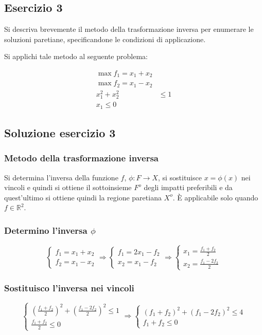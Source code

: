 \documentclass[\main/main.tex]{subfiles}
\begin{document}
\subsection{Esercizio 3}
Si descriva brevemente il metodo della trasformazione inversa per enumerare le soluzioni paretiane, specificandone le condizioni di applicazione.

Si applichi tale metodo al seguente problema:

\begin{align*}
	\max f_1  = x_1 + x_2  \\
	\max f_2  = x_1 - x_2  \\
	x_1^2 + x_2^2 & \leq 1 \\
	x_1 \leq 0
\end{align*}

\subsection{Soluzione esercizio 3}

\subsubsection*{Metodo della trasformazione inversa}
Si determina l'inversa della funzione $f$, $\phi: F \rightarrow X$, si sostituisce $x = \phi(x)$ nei vincoli e quindi si ottiene il sottoinsieme $F^o$ degli impatti preferibili e da quest'ultimo si ottiene quindi la regione paretiana $X^o$. È applicabile solo quando $f \in \mathbb{R}^2$.

\subsubsection*{Determino l'inversa $\phi$}
\[
	\begin{cases}
		f_1  = x_1 + x_2 \\
		f_2  = x_1 - x_2
	\end{cases}
	\Rightarrow
	\begin{cases}
		f_1  = 2x_1 - f_2 \\
		x_2  = x_1 - f_2
	\end{cases}
	\Rightarrow
	\begin{cases}
		x_1  = \frac{f_1 + f_2}{2} \\
		x_2  = \frac{f_1 - 2f_2}{2}
	\end{cases}
\]

\subsubsection*{Sostituisco l'inversa nei vincoli}
\[
	\begin{cases}
		\left( \frac{f_1 + f_2}{2} \right)^2 + \left(\frac{f_1 - 2f_2}{2}\right)^2 \leq 1 \\
		\frac{f_1 + f_2}{2} \leq 0
	\end{cases}
	\Rightarrow
	\begin{cases}
		\left( f_1 + f_2 \right)^2 + \left(f_1 - 2f_2\right)^2 \leq 4 \\
		f_1 + f_2 \leq 0
	\end{cases}
\]
\end{document}
